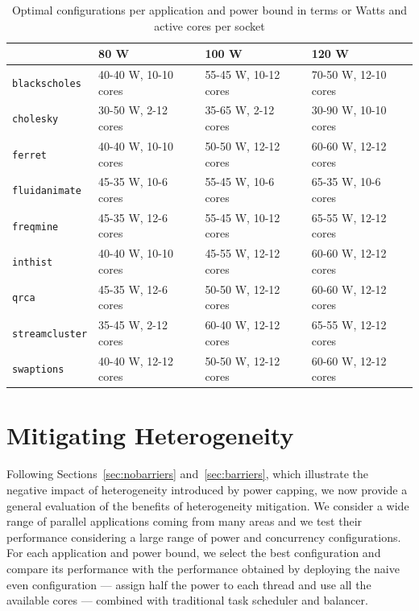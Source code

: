 \begin{table}[]
\centering
\caption{Optimal configurations per application and power bound in terms or Watts and active cores per socket}
\label{table:optimal_configuration}
\def\arraystretch{1.5}%
\begin{tabular}{l|l|l|l|}
\cline{2-4}
                                    & 80 W & 100 W & 120 W \\ \hline
\multicolumn{1}{|l|}{\texttt{blackscholes}}  & 40-40 W, 10-10 cores & 55-45 W, 10-12 cores & 70-50 W, 12-10 cores \\ \hline
\multicolumn{1}{|l|}{\texttt{cholesky}}      & 30-50 W, 2-12 cores & 35-65 W, 2-12 cores & 30-90 W, 10-10 cores \\ \hline
\multicolumn{1}{|l|}{\texttt{ferret}}        & 40-40 W, 10-10 cores & 50-50 W, 12-12 cores & 60-60 W, 12-12 cores \\ \hline
\multicolumn{1}{|l|}{\texttt{fluidanimate}}  & 45-35 W, 10-6 cores & 55-45 W, 10-6 cores & 65-35 W, 10-6 cores \\ \hline
\multicolumn{1}{|l|}{\texttt{freqmine}}      & 45-35 W, 12-6 cores & 55-45 W, 10-12 cores & 65-55 W, 12-12 cores \\ \hline
\multicolumn{1}{|l|}{\texttt{inthist}}       & 40-40 W, 10-10 cores & 45-55 W, 12-12 cores & 60-60 W, 12-12 cores \\ \hline
\multicolumn{1}{|l|}{\texttt{qrca}}          & 45-35 W, 12-6 cores & 50-50 W, 12-12 cores & 60-60 W, 12-12 cores \\ \hline
\multicolumn{1}{|l|}{\texttt{streamcluster}} & 35-45 W, 2-12 cores & 60-40 W, 12-12 cores & 65-55 W, 12-12 cores \\ \hline
\multicolumn{1}{|l|}{\texttt{swaptions}}     & 40-40 W, 12-12 cores & 50-50 W, 12-12 cores & 60-60 W, 12-12 cores \\ \hline

\end{tabular}
\vspace{.5cm}
\end{table}


\section{Mitigating Heterogeneity}
\label{sec:static_analysis}
Following Sections~\ref{sec:nobarriers} and~\ref{sec:barriers}, which illustrate the
negative impact of heterogeneity introduced by power capping, we now provide a general
evaluation of the benefits of heterogeneity mitigation.  We consider a wide range of
parallel applications coming from many areas and we test their performance considering a
large range of power and concurrency configurations.  For each application and power
bound, we select the best configuration and compare its performance with the performance
obtained by deploying the naive even configuration --- assign half the power to each
thread and use all the available cores --- combined with traditional task scheduler and
balancer.


